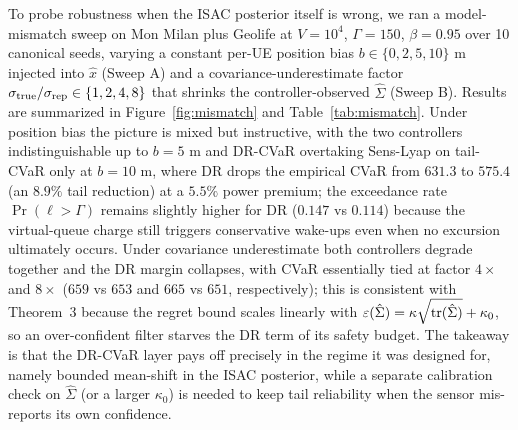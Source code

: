 
To probe robustness when the ISAC posterior itself is wrong, we ran a model-mismatch sweep on Mon Milan plus Geolife at $V{=}10^4$, $\Gamma{=}150$, $\beta{=}0.95$ over 10 canonical seeds, varying a constant per-UE position bias $b\in\{0,2,5,10\}$ m injected into $\hat{x}$ (Sweep A) and a covariance-underestimate factor $\sigma_{\rm true}/\sigma_{\rm rep}\in\{1,2,4,8\}$ that shrinks the controller-observed $\hat\Sigma$ (Sweep B). Results are summarized in Figure~\ref{fig:mismatch} and Table~\ref{tab:mismatch}. Under position bias the picture is mixed but instructive, with the two controllers indistinguishable up to $b=5$ m and DR-CVaR overtaking Sens-Lyap on tail-CVaR only at $b=10$ m, where DR drops the empirical CVaR from $631.3$ to $575.4$ (an $8.9\%$ tail reduction) at a $5.5\%$ power premium; the exceedance rate $\Pr(\ell>\Gamma)$ remains slightly higher for DR ($0.147$ vs $0.114$) because the virtual-queue charge still triggers conservative wake-ups even when no excursion ultimately occurs. Under covariance underestimate both controllers degrade together and the DR margin collapses, with CVaR essentially tied at factor $4\times$ and $8\times$ ($659$ vs $653$ and $665$ vs $651$, respectively); this is consistent with Theorem~3 because the regret bound scales linearly with $\varepsilon(\hat\Sigma)=\kappa\sqrt{{\rm tr}(\hat\Sigma)}+\kappa_0$, so an over-confident filter starves the DR term of its safety budget. The takeaway is that the DR-CVaR layer pays off precisely in the regime it was designed for, namely bounded mean-shift in the ISAC posterior, while a separate calibration check on $\hat\Sigma$ (or a larger $\kappa_0$) is needed to keep tail reliability when the sensor mis-reports its own confidence.
